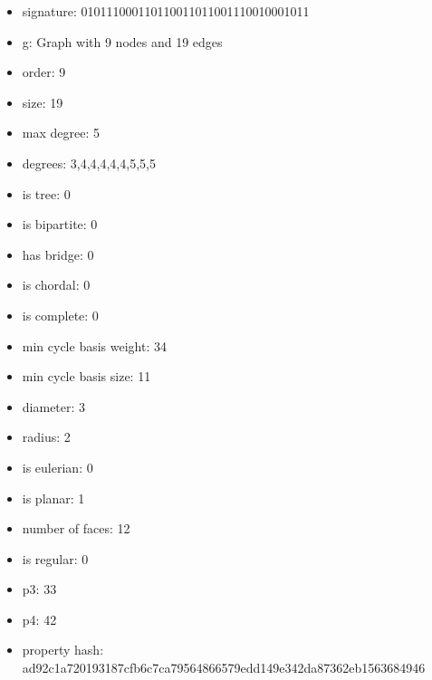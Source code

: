 \newpage
\begin{figure}
\end{figure}
\begin{itemize}
\item signature: 010111000110110011011001110010001011
\item g: Graph with 9 nodes and 19 edges
\item order: 9
\item size: 19
\item max degree: 5
\item degrees: 3,4,4,4,4,4,5,5,5
\item is tree: 0
\item is bipartite: 0
\item has bridge: 0
\item is chordal: 0
\item is complete: 0
\item min cycle basis weight: 34
\item min cycle basis size: 11
\item diameter: 3
\item radius: 2
\item is eulerian: 0
\item is planar: 1
\item number of faces: 12
\item is regular: 0
\item p3: 33
\item p4: 42
\item property hash: ad92c1a720193187cfb6c7ca79564866579edd149e342da87362eb1563684946
\end{itemize}
